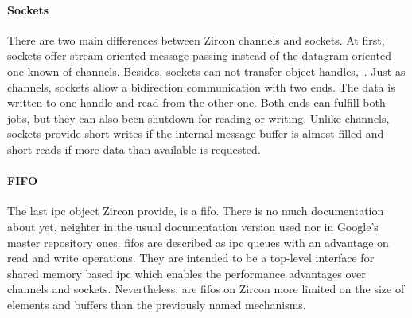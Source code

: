 \paragraph{Sockets}
There are two main differences between Zircon channels and sockets.
At first, sockets offer stream-oriented message passing instead of the datagram oriented one known of channels.
Besides, sockets can not transfer object handles\cite{zircon-concepts},~\cite{zircon-socket}.
Just as channels, sockets allow a bidirection communication with two ends.
The data is written to one handle and read from the other one. 
Both ends can fulfill both jobs, but they can also been shutdown for reading or writing\cite{zircon-socket}.
Unlike channels, sockets provide short writes if the internal message buffer is almost filled and short reads if more data than available is requested\cite{zircon-concepts}.

%
%
%

\paragraph{FIFO}
The last \ac{ipc} object Zircon provide, is a \ac{fifo}.
There is no much documentation about yet, neighter in the usual documentation version used nor in Google's master repository ones.
\acp{fifo} are described as \ac{ipc} queues with an advantage on read and write operations.
They are intended to be a top-level interface for shared memory based \ac{ipc} which enables the performance advantages over channels and sockets.
Nevertheless, are \acp{fifo} on Zircon more limited on the size of elements and buffers than the previously named mechanisms\cite{zircon-fifo}.

%


